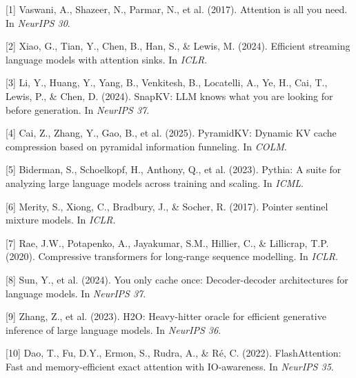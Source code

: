 \documentclass{article}
\begin{document}
{\small

[1] Vaswani, A., Shazeer, N., Parmar, N., et al. (2017). Attention is all you need. In \textit{NeurIPS 30}.

[2] Xiao, G., Tian, Y., Chen, B., Han, S., \& Lewis, M. (2024). Efficient streaming language models with attention sinks. In \textit{ICLR}.

[3] Li, Y., Huang, Y., Yang, B., Venkitesh, B., Locatelli, A., Ye, H., Cai, T., Lewis, P., \& Chen, D. (2024). SnapKV: LLM knows what you are looking for before generation. In \textit{NeurIPS 37}.

[4] Cai, Z., Zhang, Y., Gao, B., et al. (2025). PyramidKV: Dynamic KV cache compression based on pyramidal information funneling. In \textit{COLM}.

[5] Biderman, S., Schoelkopf, H., Anthony, Q., et al. (2023). Pythia: A suite for analyzing large language models across training and scaling. In \textit{ICML}.

[6] Merity, S., Xiong, C., Bradbury, J., \& Socher, R. (2017). Pointer sentinel mixture models. In \textit{ICLR}.

[7] Rae, J.W., Potapenko, A., Jayakumar, S.M., Hillier, C., \& Lillicrap, T.P. (2020). Compressive transformers for long-range sequence modelling. In \textit{ICLR}.

[8] Sun, Y., et al. (2024). You only cache once: Decoder-decoder architectures for language models. In \textit{NeurIPS 37}.

[9] Zhang, Z., et al. (2023). H2O: Heavy-hitter oracle for efficient generative inference of large language models. In \textit{NeurIPS 36}.

[10] Dao, T., Fu, D.Y., Ermon, S., Rudra, A., \& R\'{e}, C. (2022). FlashAttention: Fast and memory-efficient exact attention with IO-awareness. In \textit{NeurIPS 35}.

}
\end{document}
